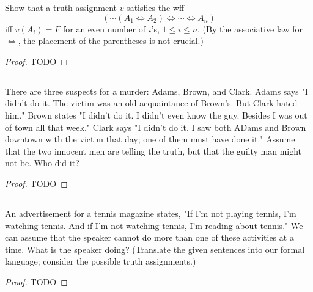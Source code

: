 \documentclass{report}
\begin{document}
  Show that a truth assignment $v$ satisfies the wff
    $$(\cdots (A_1 \Leftrightarrow A_2)
      \Leftrightarrow \cdots \Leftrightarrow A_n)$$
    iff $v(A_i) = F$ for an even number of $i$'s, $1 \leq i \leq n$.
  (By the associative law for $\Leftrightarrow$, the placement of the
    parentheses is not crucial.)

  \begin{proof}
    TODO
  \end{proof}

\subsection{}%

  There are three suspects for a murder: Adams, Brown, and Clark.
  Adams says "I didn't do it. The victim was an old acquaintance of Brown's.
    But Clark hated him."
  Brown states "I didn't do it. I didn't even know the guy. Besides I was out of
    town all that week."
  Clark says "I didn't do it. I saw both ADams and Brown downtown with the
    victim that day; one of them must have done it."
  Assume that the two innocent men are telling the truth, but that the guilty
    man might not be.
  Who did it?

  \begin{proof}
    TODO
  \end{proof}

\subsection{}%

  An advertisement for a tennis magazine states, "If I'm not playing tennis,
    I'm watching tennis. And if I'm not watching tennis, I'm reading about
    tennis."
  We can assume that the speaker cannot do more than one of these activities at
    a time.
  What is the speaker doing?
  (Translate the given sentences into our formal language; consider the possible
    truth assignments.)

  \begin{proof}
    TODO
  \end{proof}

\subsection{}%
\end{document}
